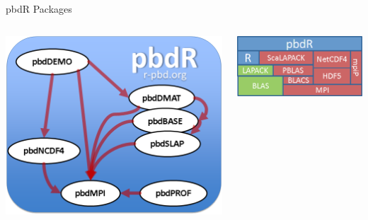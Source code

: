 \begin{frame}
  \begin{block}{pbdR Packages}
    \begin{center}
      \begin{columns}
        \begin{column}{.52\textwidth}
      \includegraphics[scale=.4]{../common/pics/pbdR}
        \end{column}
        \hspace{.05cm}
        \begin{column}{.4\textwidth}
      \includegraphics[scale=.45]{../common/pics/libs}
        \end{column}
      \end{columns}
    \end{center}
  \end{block}
\end{frame}




